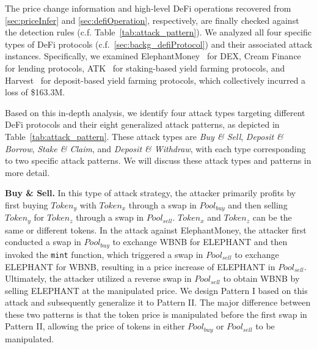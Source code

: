 The price change information and high-level DeFi operations recovered from \mysec\ref{sec:priceInfer} and \mysec\ref{sec:defiOperation}, respectively, are finally checked against the detection rules (c.f. Table~\ref{tab:attack_pattern}).
We analyzed all four specific types of DeFi protocols (c.f.~\mysec\ref{sec:backg_defiProtocol}) and their associated attack instances.
Specifically, we examined ElephantMoney~\cite{elephantMoney} for DEX, Cream Finance~\cite{CreamFinance} for lending protocols, ATK~\cite{ATK} for staking-based yield farming protocols, and Harvest~\cite{Harvest} for deposit-based yield farming protocols, which collectively incurred a loss of \$163.3M.

Based on this in-depth analysis, we identify four attack types targeting different DeFi protocols and their eight generalized attack patterns, as depicted in Table~\ref{tab:attack_pattern}.
These attack types are \textit{Buy \& Sell}, \textit{Deposit \& Borrow}, \textit{Stake \& Claim}, and \textit{Deposit \& Withdraw}, with each type corresponding to two specific attack patterns.
We will discuss these attack types and patterns in more detail.

\noindent\textbf{Buy \& Sell.}
In this type of attack strategy, the attacker primarily profits by first buying $Token_y$ with $Token_x$ through a swap in $Pool_{buy}$ and then selling $Token_y$ for $Token_z$ through a swap in $Pool_{sell}$.
$Token_x$ and $Token_z$ can be the same or different tokens.
In the attack against ElephantMoney, the attacker first conducted a swap in $Pool_{buy}$ to exchange WBNB for ELEPHANT and then invoked the \texttt{mint} function, which triggered a swap in $Pool_{sell}$ to exchange ELEPHANT for WBNB, resulting in a price increase of ELEPHANT in $Pool_{sell}$.
Ultimately, the attacker utilized a reverse swap in $Pool_{sell}$ to obtain WBNB by selling ELEPHANT at the manipulated price.
We design Pattern I based on this attack and subsequently generalize it to Pattern II.
The major difference between these two patterns is that the token price is manipulated before the first swap in Pattern II, allowing the price of tokens in either $Pool_{buy}$ or $Pool_{sell}$ to be manipulated.

